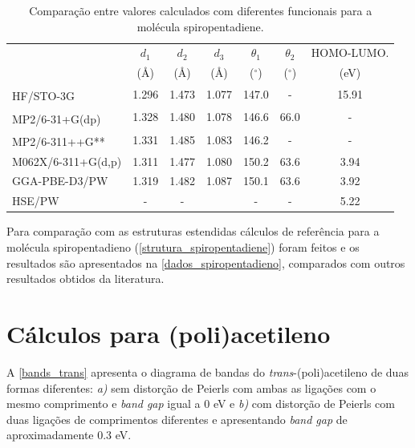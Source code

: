 \documentclass[
	12pt,				%
	openright,			%
	twoside,			%
	a4paper,			%
	chapter=TITLE,		%
	english,			%
	french,				%
	spanish,			%
	brazil				%
	]{abntex2}
\begin{document}
\begin{apendicesenv}
	

	\begin{table}[!ht]
		\centering
		\caption{Comparação entre valores calculados com diferentes funcionais para a molécula spiropentadiene.}
		\label{dados_spiropentadieno}
		\renewcommand{\arraystretch}{1.2}
		\small\selectfont
		\begin{tabular}{l|cccccc}
			\hline\hline
						            &  $d_1$  & $d_2$ & $d_3$ & $\theta_1$ & $\theta_2$ & HOMO-LUMO.     \\
			  		 	            & (\AA{}) & (\AA{}) & (\AA{}) & ($^\circ$) & ($^\circ$)  & (eV)    \\ \hline
			HF/STO-3G \textsuperscript{\cite{kao1978ab}}  & 1.296   & 1.473   & 1.077   & 147.0      &    -     &  15.91  \\
			MP2/6-31+G(dp) \textsuperscript{\cite{shavitt1991ab}}  & 1.328   & 1.480   & 1.078   & 146.6      &    66.0     &  -  \\
			MP2/6-311++G** \textsuperscript{\cite{dodziuk2001theoretical}}  & 1.331   & 1.485   & 1.083   & 146.2      &    -     &  -  \\
			M062X/6-311+G(d,p)      & 1.311   & 1.477   & 1.080   & 150.2     &   63.6     &  3.94   \\
			GGA-PBE-D3/PW           & 1.319   & 1.482   & 1.087   & 150.1     &   63.6      & 3.92        \\
			HSE/PW                  &  -   & -   &         &     -       &      -       & 5.22        \\
			\hline\hline         
		\end{tabular}
	\end{table}
	
	
	Para comparação com as estruturas estendidas cálculos de referência para a molécula spiropentadieno (\autoref{strutura_spiropentadiene}) foram feitos e os resultados são apresentados na \autoref{dados_spiropentadieno}, comparados com outros resultados obtidos da literatura. 

\section{Cálculos para (poli)acetileno} \label{chap:bands_poliacetileno}
	
	A \autoref{bands_trans} apresenta o diagrama de bandas do \textit{trans}-(poli)acetileno de duas formas diferentes: \textit{a)} sem distorção de Peierls com ambas as ligações com o mesmo comprimento e \textit{band gap} igual a 0 eV e \textit{b)} com distorção de Peierls com duas ligações de comprimentos diferentes e apresentando \textit{band gap} de aproximadamente 0.3 eV.
	

\end{apendicesenv}
\end{document}
